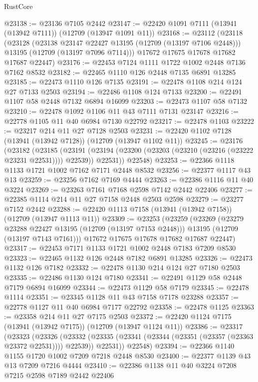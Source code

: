 \begin{lexlean}{RustCore}
\begin{coremodule}
@23138 := @23136 @7105 @2442
@23147 := @22420 @1091 @7111 (@13941 (@13942 @7111)) (@12709 (@13947 @1091 @11))
@23168 := @23112
    (@23118
      (@23128
        (@23138 @23147 @22427 @13195 (@12709 (@13197 @7106 @2448)))
        @13195
        (@12709 (@13197 @7096 @7114)))
      @17672
      @17675
      @17678
      @17682
      @17687
      @22447)
@23176 := @22453 @7124 @1111 @1722 @1002 @2448 @7136 @7162 @8532
@23182 := @22465 @1110 @126 @2448 @7135 @6891 @13285
@23185 := @22473 @1110 @126 @7135
@23191 := @22478 @1108 @214 @124 @27 @7133 @2503
@23194 := @22486 @1108 @124 @7133
@23200 := @22491 @1107 @58 @2448 @7132 @6894 @16099
@23203 := @22473 @1107 @58 @7132
@23210 := @22478 @1092 @1106 @11 @43 @7111 @7131 @23147
@23216 := @22778 @1105 @11 @40 @6984 @7130 @22792
@23217 := @22478 @1103
@23222 := @23217 @214 @11 @27 @7128 @2503
@23231 := @22420 @1102 @7128 (@13941 (@13942 @7128)) (@12709 (@13947 @1102 @11))
@23245 := @23176
    (@23182
      (@23185
        (@23191 (@23194 (@23200 (@23203 (@23210 (@23216 (@23222 @23231 @22531)))) @22539)) @22531))
      @22548)
@23253 := @22366 @1118 @1133 @1721 @1002 @7162 @7171 @2448 @8532
@23256 := @22377 @1117 @43 @13
@23259 := @23256 @7162 @7169 @4444
@23263 := @22386 @1116 @11 @40 @3224
@23269 := @23263 @7161 @7168 @2598 @7142 @2442 @22406
@23277 := @22385 @1114 @214 @11 @27 @7158 @2448 @2503 @2598
@23279 := @23277 @7152 @2442
@23288 := @22420 @1113 @7158 (@13941 (@13942 @7158)) (@12709 (@13947 @1113 @11))
@23309 := @23253
    (@23259
      (@23269
        (@23279 @23288 @22427 @13195 (@12709 (@13197 @7153 @2448)))
        @13195
        (@12709 (@13197 @7143 @7161)))
      @17672
      @17675
      @17678
      @17682
      @17687
      @22447)
@23317 := @22453 @7171 @1133 @1721 @1002 @2448 @7183 @7209 @8530
@23323 := @22465 @1132 @126 @2448 @7182 @6891 @13285
@23326 := @22473 @1132 @126 @7182
@23332 := @22478 @1130 @214 @124 @27 @7180 @2503
@23335 := @22486 @1130 @124 @7180
@23341 := @22491 @1129 @58 @2448 @7179 @6894 @16099
@23344 := @22473 @1129 @58 @7179
@23345 := @22478 @1114
@23351 := @23345 @1128 @11 @43 @7158 @7178 @23288
@23357 := @22778 @1127 @11 @40 @6984 @7177 @22792
@23358 := @22478 @1125
@23363 := @23358 @214 @11 @27 @7175 @2503
@23372 := @22420 @1124 @7175 (@13941 (@13942 @7175)) (@12709 (@13947 @1124 @11))
@23386 := @23317
    (@23323
      (@23326
        (@23332 (@23335 (@23341 (@23344 (@23351 (@23357 (@23363 @23372 @22531)))) @22539)) @22531))
      @22548)
@23394 := @22366 @1140 @1155 @1720 @1002 @7209 @7218 @2448 @8530
@23400 := @22377 @1139 @43 @13 @7209 @7216 @4444
@23410 := @22386 @1138 @11 @40 @3224 @7208 @7215 @2598 @7189 @2442 @22406

\end{coremodule}
\end{lexlean}
